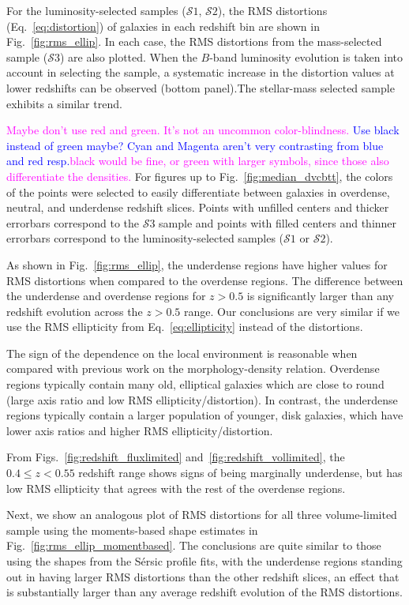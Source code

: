 \documentclass[twocolumn,useAMS,usenatbib]{mn2e}
\newcommand{\arun}[1]{{\textcolor{blue}{#1}}}
\newcommand{\claire}[1]{{\textcolor{magenta}{#1}}}
\newcommand{\sersic}{S\'{e}rsic }
\newcommand{\s}{\ensuremath{\mathcal{S}}}
\begin{document}
For the luminosity-selected samples (\s$1$, \s$2$), the
RMS distortions (Eq.~\ref{eq:distortion}) of galaxies in each redshift bin are shown
in Fig.~\ref{fig:rms_ellip}. In each case, the RMS distortions from the mass-selected sample (\s$3$) are also plotted.
When the $B$-band luminosity evolution is taken into account in selecting the sample, a systematic increase in the distortion values at
lower redshifts can be observed (bottom panel).The stellar-mass selected sample exhibits a similar trend.

\claire{Maybe don't use red and green. It's not an uncommon color-blindness.} \arun{Use black instead of green maybe? Cyan and Magenta aren't very contrasting from blue and red resp.}\claire{black would be fine, or green with larger symbols, since those also differentiate the densities.} 
For figures up to Fig.~\ref{fig:median_dvcbtt}, the colors of the points were selected to easily differentiate between galaxies in overdense, neutral, and underdense redshift slices.
Points with unfilled centers and thicker errorbars correspond to the \s$3$ sample and points with filled centers and thinner errorbars correspond to the luminosity-selected samples (\s$1$ or \s$2$).

As shown in Fig.~\ref{fig:rms_ellip}, the underdense regions have higher values for RMS distortions when compared to the
overdense regions. The difference between the underdense and overdense
regions for $z>0.5$ is significantly larger than any redshift
evolution across the $z>0.5$ range.  
Our conclusions are very similar if we use the RMS ellipticity from Eq.~\eqref{eq:ellipticity} instead
of the distortions.

The sign of the dependence on the local environment is reasonable when
compared with previous work on the morphology-density
relation. Overdense regions typically contain many old, elliptical
galaxies which are close to round (large axis ratio and low RMS ellipticity/distortion). 
In contrast, the underdense regions typically contain a larger
population of younger, disk galaxies, which have lower axis ratios and
higher RMS ellipticity/distortion.

From Figs.~\ref{fig:redshift_fluxlimited} and~\ref{fig:redshift_vollimited},
the $0.4\le z < 0.55$ redshift range shows signs of being marginally
underdense, but has low RMS ellipticity that agrees with the rest of the overdense regions.

Next, we show an analogous plot of RMS distortions %
for all three
volume-limited sample using the moments-based shape estimates in
Fig.~\ref{fig:rms_ellip_momentbased}. The conclusions are quite
similar to those using the shapes from the \sersic profile fits, with
the underdense regions standing out in having larger RMS distortions 
than the other redshift slices, an effect that is substantially larger
than any average redshift evolution of the RMS distortions.
\end{document}
